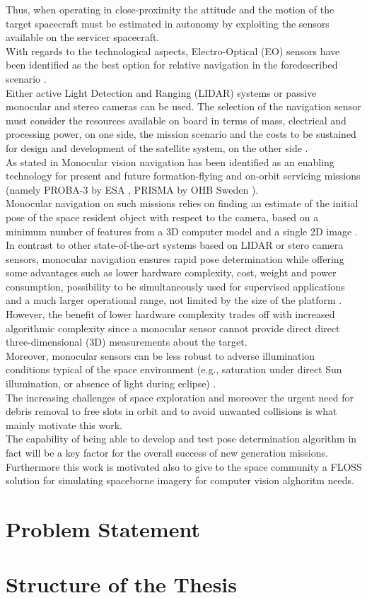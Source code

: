 Thus, when operating in close-proximity the attitude and the motion of the target spacecraft must be estimated in autonomy by exploiting the sensors available on the servicer spacecraft.\\
With regards to the technological aspects, Electro-Optical (EO) sensors have been identified as the best option for relative navigation in the foredescribed scenario \cite{Opromolla2017} \cite{pesciolino}.\\
Either active Light Detection and Ranging (LIDAR) systems or passive monocular and stereo cameras can be used. The selection of the navigation sensor must consider the resources available on board in terms of mass, electrical and processing power, on one side, the mission scenario and the costs to be sustained for design and development of the satellite system, on the other side \cite{clerc2012astrium} \cite{pesciolino}.\\
As stated in \cite{Sharma2016} Monocular vision navigation has been identified as an enabling technology for present and future formation-flying and on-orbit servicing missions (namely PROBA-3 by ESA \cite{Casti2019}, PRISMA by OHB Sweden \cite{2013Damico}).\\
Monocular navigation on such missions relies on finding an estimate of the initial pose of the space resident object with respect to the camera, based on a minimum number of features from a 3D computer model and a single 2D image \cite{Sharma2016}.\\
In contrast to other state-of-the-art systems based on LIDAR or stero camera sensors, monocular navigation ensures rapid pose determination while offering some advantages such as lower hardware complexity, cost, weight and power consumption, possibility to be simultaneously used for supervised applications and a much larger operational range, not limited by the size of the platform \cite{Sharma2018} \cite{2016Ventura} \cite{pesciolino}.
However, the benefit of lower hardware complexity trades off with increased algorithmic complexity since a monocular sensor cannot provide direct
direct three-dimensional (3D) measurements about the target.\\
Moreover, monocular sensors can be less robust to adverse illumination conditions typical of the space environment \cite{Volpe2017} (e.g., saturation under direct Sun illumination, or absence of light during eclipse) \cite{pesciolino}.\\
The increasing challenges of space exploration and moreover the urgent need for debris removal to free slots in orbit and to avoid unwanted collisions is what mainly motivate this work.\\
The capability of being able to develop and test pose determination algorithm in fact will be a key factor for the overall success of new generation missions.\\
Furthermore this work is motivated also to give to the space community a FLOSS solution for simulating spaceborne imagery for computer vision alghoritm needs.\\

\section{Problem Statement}

\section{Structure of the Thesis}
